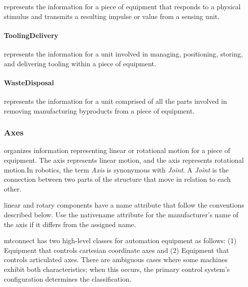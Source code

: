  represents the information for a piece of equipment that responds to a physical stimulus and transmits a resulting impulse or value from a sensing unit.


\paragraph{ToolingDelivery}\mbox{}
\label{sec:ToolingDelivery}



 represents the information for a unit involved in managing, positioning, storing, and delivering tooling within a piece of equipment.



\paragraph{WasteDisposal}\mbox{}
\label{sec:WasteDisposal}



 represents the information for a unit comprised of all the parts involved in removing manufacturing byproducts from a piece of equipment.



\subsubsection{Axes}
\label{sec:Axes}



 organizes information representing linear or rotational motion for a piece of equipment. The  axis  represents linear motion, and the axis  represents rotational motion.In robotics, the term \textit{Axis} is synonymous with \textit{Joint}. A \textit{Joint} is the connection between two parts of the structure that move in relation to each other.

\gls{linear} and \gls{rotary} components \MUST have a \gls{name} attribute that \MUST follow the conventions described below. Use the \gls{nativename} attribute for the manufacturer's name of the axis if it differs from the assigned \gls{name}.

\gls{mtconnect} has two high-level classes for automation equipment as follows: (1) Equipment that controls cartesian coordinate axes and (2) Equipment that controls articulated axes. There are ambiguous cases where some machines exhibit both characteristics; when this occurs, the primary control system's configuration determines the classification.

